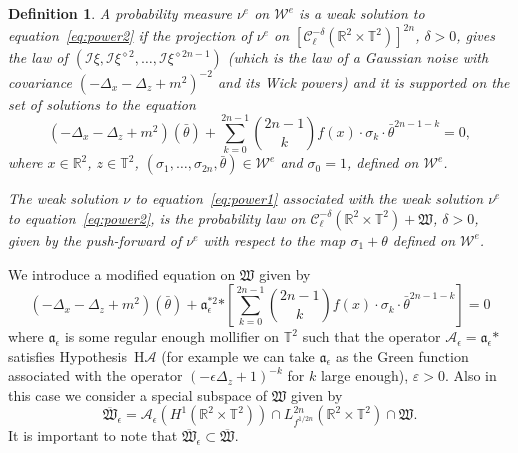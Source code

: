 \documentclass[a4paper,10pt]{article}
\newcommand{\asterisk}{\mathord{*}}
\newtheorem{definition}[theorem]{Definition}
\begin{document}
\begin{definition}
  \label{definition_we}A probability measure $\nu^e$ on $\mathcal{W}^e$ is a
  weak solution to equation~{\eqref{eq:power2}} if the projection of $\nu^e$
  on $[\mathcal{C}^{- \delta}_{\ell} (\mathbb{R}^2 \times \mathbb{T}^2)]^{2
  n}$, $\delta > 0$, gives the law of $(\mathcal{I} \xi, \mathcal{I}
  \xi^{\diamond 2}, \ldots, \mathcal{I} \xi^{\diamond 2 n - 1})$ (which is the
  law of a Gaussian noise with covariance $(- \Delta_x - \Delta_z + m^2)^{-
  2}$ and its Wick powers) and it is supported on the set of solutions to the
  equation
  \begin{equation}
    (- \Delta_x - \Delta_z + m^2) (\bar{\theta}) + \sum_{k = 0}^{2 n - 1}
    \binom{2 n - 1}{k} f (x) \cdot \sigma_k \cdot \bar{\theta}^{2 n - 1 - k} =
    0, \label{eq:power3}
  \end{equation}
  where $x \in \mathbb{R}^2$, $z \in \mathbb{T}^2$, $(\sigma_1, \ldots,
  \sigma_{2 n}, \bar{\theta}) \in \mathcal{W}^e$ and $\sigma_0 = 1$, defined
  on $\mathcal{W}^e$.
  
  The weak solution $\nu$ to equation~{\eqref{eq:power1}} associated with the
  weak solution $\nu^e$ to equation~{\eqref{eq:power2}}, is the probability
  law on $\mathcal{C}^{- \delta}_{\ell} (\mathbb{R}^2 \times \mathbb{T}^2) +
  \mathfrak{W}$, $\delta > 0$, given by the push-forward of $\nu^e$ with
  respect to the map $\sigma_1 + \theta$ defined on $\mathcal{W}^e$.
\end{definition}

We introduce a modified equation on $\mathfrak{W}$ given by
\begin{equation}
  (- \Delta_x - \Delta_z + m^2) (\bar{\theta}) + \mathfrak{a}^{\asterisk
  2}_{\epsilon} \asterisk \left[ \sum_{k = 0}^{2 n - 1} \binom{2 n - 1}{k} f
  (x) \cdot \sigma_k \cdot \bar{\theta}^{2 n - 1 - k} \right] = 0
  \label{eq:power4}
\end{equation}
where $\mathfrak{a}_{\epsilon}$ is some regular enough mollifier on
$\mathbb{T}^2$ such that the operator $\mathcal{A}_{\epsilon} =
\mathfrak{a}_{\epsilon} \asterisk$ satisfies Hypothesis~H$\mathcal{A}$ (for
example we can take $\mathfrak{a}_{\epsilon}$ as the Green function associated
with the operator $(- \epsilon \Delta_z + 1)^{- k}$ for $k$ large enough),
$\varepsilon > 0$. Also in this case we consider a special subspace of
$\mathfrak{W}$ given by
\[ \overline{\mathfrak{W}}_{\epsilon} = \mathcal{A}_{\epsilon} (H^1
   (\mathbb{R}^2 \times \mathbb{T}^2)) \cap L^{2 n}_{f^{1 / 2 n}}
   (\mathbb{R}^2 \times \mathbb{T}^2) \cap \mathfrak{W} . \]
It is important to note that $\overline{\mathfrak{W}}_{\epsilon} \subset
\overline{\mathfrak{W}}$.
\end{document}
